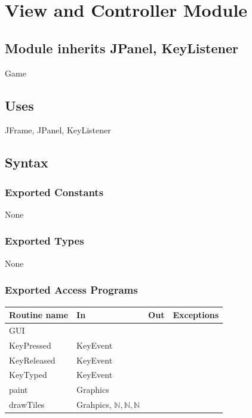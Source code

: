\documentclass[12pt]{article}
\begin{document}
\newpage

\section*{View and Controller Module}

\subsection*{Module inherits JPanel, KeyListener}

Game

\subsection*{Uses}

JFrame, JPanel, KeyListener

\subsection* {Syntax}

\subsubsection* {Exported Constants}

None

\subsubsection* {Exported Types}

None 

\subsubsection* {Exported Access Programs}

\begin{tabular}{| l | l | l | l |}
    \hline
    \textbf{Routine name} & \textbf{In} & \textbf{Out} &\textbf{Exceptions}\\
    \hline
    GUI & &  &\\
    \hline
    KeyPressed & KeyEvent & &\\
    \hline
    KeyReleased & KeyEvent & &\\
    \hline
    KeyTyped & KeyEvent & &\\
    \hline
    paint & Graphics& & \\
    \hline
    drawTiles & Grahpics, $\mathbb{N}, \mathbb{N}, \mathbb{N}$ & &\\
    \hline
    \end{tabular}
\end{document}
